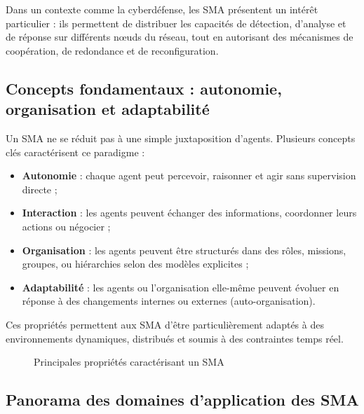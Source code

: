 \documentclass[ twoside,openright,titlepage,numbers=noenddot,headinclude,%
                footinclude=true,cleardoublepage=empty,abstractoff, %
                BCOR=5mm,paper=a4,fontsize=11pt,%
                french,american,%
                ]{scrreprt}
\begin{document}
Dans un contexte comme la cyberdéfense, les SMA présentent un intérêt particulier : ils permettent de distribuer les capacités de détection, d'analyse et de réponse sur différents nœuds du réseau, tout en autorisant des mécanismes de coopération, de redondance et de reconfiguration.

\vspace{0.5em}
\subsection*{Concepts fondamentaux : autonomie, organisation et adaptabilité}

Un SMA ne se réduit pas à une simple juxtaposition d'agents. Plusieurs concepts clés caractérisent ce paradigme :

\begin{itemize}
    \item \textbf{Autonomie} : chaque agent peut percevoir, raisonner et agir sans supervision directe ;
    \item \textbf{Interaction} : les agents peuvent échanger des informations, coordonner leurs actions ou négocier ;
    \item \textbf{Organisation} : les agents peuvent être structurés dans des rôles, missions, groupes, ou hiérarchies selon des modèles explicites ;
    \item \textbf{Adaptabilité} : les agents ou l'organisation elle-même peuvent évoluer en réponse à des changements internes ou externes (auto-organisation).
\end{itemize}

Ces propriétés permettent aux SMA d'être particulièrement adaptés à des environnements dynamiques, distribués et soumis à des contraintes temps réel.

\begin{figure}[H]
    \centering
    \caption{Principales propriétés caractérisant un SMA}
    \label{fig:sma-proprietes}
\end{figure}

\vspace{0.5em}
\subsection*{Panorama des domaines d'application des SMA}
\end{document}
